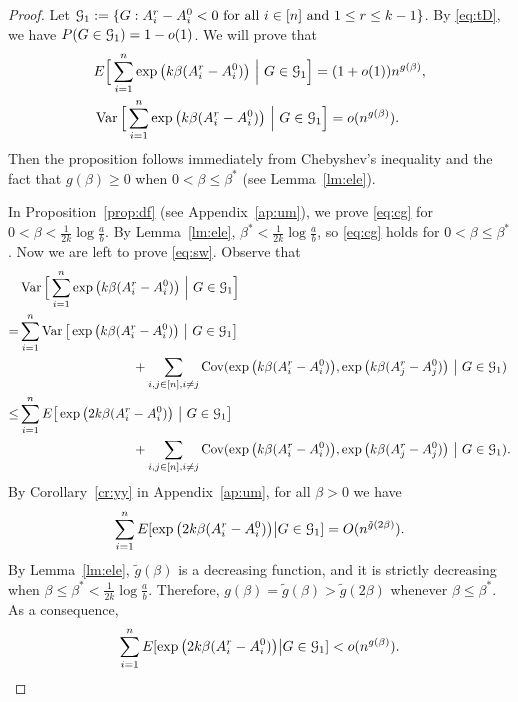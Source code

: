 \documentclass{article}
\begin{document}
\begin{proof}
Let $\mathcal{G}_1:=\{G:A^r_i-A^0_i<0\text{~for all~}i\in[n] \text{ and } 1\leq r \leq k-1 \}$. By \eqref{eq:tD}, we have $P(G\in\mathcal{G}_1)=1-o(1)$. We will prove that
\begin{align}
& E \Big[ \sum_{i=1}^n  \exp\big(k\beta (A^r_i-A^0_i) \big) ~\Big|~ G\in\mathcal{G}_1 \Big]
= (1+o(1)) n^{g(\beta)}  , \label{eq:cg} \\
& \operatorname{Var} \Big[ \sum_{i=1}^n  \exp\big(k\beta (A^r_i-A^0_i) \big) ~\Big|~ G\in\mathcal{G}_1 \Big]
= o (n^{g(\beta)} ) .  \label{eq:sw}
\end{align}
Then the proposition follows immediately from  Chebyshev's inequality and the fact that $g(\beta)\ge 0$ when $0<\beta\le\beta^\ast$ (see Lemma~\ref{lm:ele}).


In Proposition~\ref{prop:df} (see Appendix~\ref{ap:um}), we prove \eqref{eq:cg} for $0<\beta<\frac{1}{2k}\log\frac{a}{b}$. By Lemma~\ref{lm:ele}, $\beta^\ast<\frac{1}{2k}\log\frac{a}{b}$, so \eqref{eq:cg} holds for $0< \beta\le \beta^\ast$.
Now we are left to prove \eqref{eq:sw}. Observe that
\begin{equation} \label{eq:mh1}
\begin{aligned}
& \operatorname{Var} \Big[ \sum_{i=1}^n  \exp\big(k\beta (A^r_i-A^0_i) \big) ~\Big|~ G\in\mathcal{G}_1 \Big] \\
= & \sum_{i=1}^n  \operatorname{Var} \big[\exp\big(k\beta (A^r_i-A^0_i) \big) ~\big|~ G\in\mathcal{G}_1 \big] \\
& \hspace*{1.2in} + \sum_{i,j\in[n],i\neq j}
\operatorname{Cov}(\exp\big(k\beta (A^r_i-A^0_i) \big), \exp\big(k\beta (A^r_j-A^0_j) \big) ~\big|~ G\in\mathcal{G}_1 ) \\
\le & \sum_{i=1}^n E \big[ \exp\big(2k\beta (A^r_i-A^0_i) \big) ~\big|~ G\in\mathcal{G}_1 \big] \\
& \hspace*{1.2in} + \sum_{i,j\in[n],i\neq j}
\operatorname{Cov}(\exp\big(k\beta (A^r_i-A^0_i) \big), \exp\big(k\beta (A^r_j-A^0_j) \big) ~\big|~ G\in\mathcal{G}_1) .
\end{aligned}
\end{equation}
By Corollary~\ref{cr:yy} in Appendix~\ref{ap:um}, for all $\beta>0$ we have
$$
\sum_{i=1}^n E[ \exp\big(2k\beta (A^r_i-A^0_i) \big) \big| G\in\mathcal{G}_1]
= O ( n^{\tilde{g}(2\beta)} ) .
$$
By Lemma~\ref{lm:ele}, $\tilde{g}(\beta)$ is a decreasing function, and it is strictly decreasing when $\beta\le\beta^\ast<\frac{1}{2k}\log\frac{a}{b}$. Therefore, $g(\beta)=\tilde{g}(\beta)>\tilde{g}(2\beta)$ whenever $\beta\le\beta^\ast$. As a consequence, 
\begin{equation} \label{eq:mh2}
\sum_{i=1}^n E[ \exp\big(2k\beta (A^r_i-A^0_i) \big) \big| G\in\mathcal{G}_1]
< o ( n^{g(\beta)} ) .
\end{equation}




\end{proof}
\end{document}
